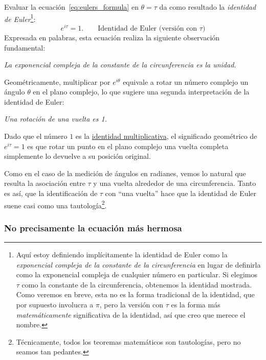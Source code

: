 Evaluar la ecuación~\eqref{eq:eulers_formula} en $\theta = \tau$ da como resultado la \emph{identidad de Euler}\footnote{Aquí estoy definiendo implícitamente la identidad de Euler como la \emph{exponencial compleja de la constante de la circunferencia} en lugar de definirla como la exponencial compleja de cualquier número en particular. Si elegimos  $\tau$ como la constante de la circunferencia, obtenemos la identidad mostrada. Como veremos en breve, esta no es la forma tradicional de la identidad, que por supuesto involucra a $\pi$, pero la versión con  $\tau$ es la forma más  \emph{matemáticamente} significativa de la identidad, así que creo que merece el nombre.}:
\[ e^{i\tau} = 1. \qquad\mbox{Identidad de Euler (versión con $\tau$)} \]
Expresada en palabras, esta ecuación realiza la siguiente observación fundamental:

\begin{center}
\emph{La exponencial compleja de la constante de la circunferencia es la unidad.}
\end{center}

Geométricamente, multiplicar por $e^{i\theta}$ equivale a rotar un número complejo un ángulo $\theta$ en el plano complejo, lo que sugiere una segunda interpretación de la identidad de Euler:

\begin{center}
\emph{Una rotación de una vuelta es 1.}
\end{center}


\noindent Dado que el número $1$ es la \href{https://es.wikipedia.org/wiki/Elemento_neutro}{identidad multiplicativa}, el significado geométrico de $e^{i\tau} = 1$ es que rotar un punto en el plano complejo una vuelta completa simplemente lo devuelve a su posición original.

Como en el caso de la medición de ángulos en radianes, vemos lo natural que resulta la asociación entre $\tau$ y una vuelta alrededor de una circunferencia. Tanto es así, que la identificación de $\tau$ con ``una vuelta'' hace que la identidad de Euler suene casi como una tautología\footnote{Técnicamente, todos los teoremas matemáticos son tautologías, pero no seamos tan pedantes.}.


    \subsubsection{No precisamente la ecuación más hermosa} %
    \label{sec:not_the_most_beautiful_equation}

